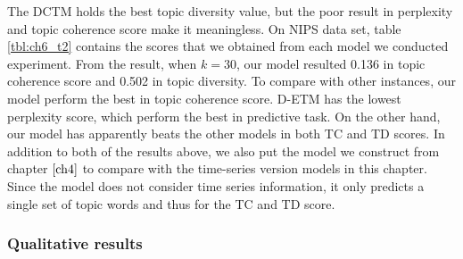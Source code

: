The DCTM holds the best topic diversity value, but the poor result in perplexity and topic coherence score make it meaningless.
On NIPS data set, table \ref{tbl:ch6_t2} contains the scores that we obtained from each model we conducted experiment. From the result, when $ k=30 $, our model resulted 0.136 in topic coherence score and 0.502 in topic diversity. To compare with other instances, our model perform the best in topic coherence score. D-ETM has the lowest perplexity score, which perform the best in predictive task. On the other hand, our model has apparently beats the other models in both TC and TD scores. 
In addition to both of the results above, we also put the model we construct from chapter $ \ref{ch4} $ to compare with the time-series version models in this chapter. Since the model does not consider time series information, it only predicts a single set of topic words and thus for the TC and TD score.
\subsubsection{Qualitative results}
